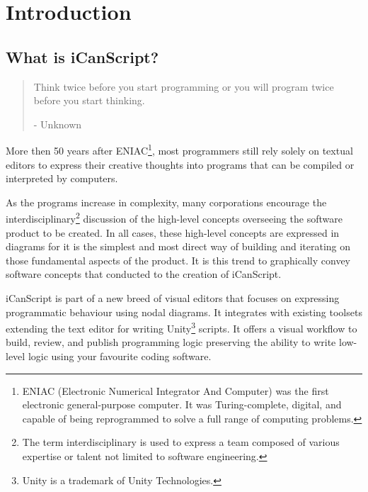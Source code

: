 
\def\mytitle{iCanScript User Guide}
\def\myauthor{Michel Launier}
\def\version{v1.1.2}
\def\email{support@icanscript.com}


\pagebreak 

\part{Introduction}
\label{introduction}

\chapter{What is iCanScript?}
\label{whatisicanscript}

\begin{quote}

\textwidth

Think twice before you start programming or you will program twice before you start thinking. 

\noindent\makebox[0.5\linewidth]{\rule{0.5\linewidth}{0.4pt}}

- Unknown
\end{quote}



More then 50 years after ENIAC\footnote{ENIAC (Electronic Numerical Integrator And Computer) was the first electronic general-purpose computer. It was Turing-complete, digital, and capable of being reprogrammed to solve a full range of computing problems.}, most programmers still rely solely on textual editors to express their creative thoughts into programs that can be compiled or interpreted by computers.

As the programs increase in complexity, many corporations encourage the interdisciplinary\footnote{The term interdisciplinary is used to express a team composed of various expertise or talent not limited to software engineering.} discussion of the high-level concepts overseeing the software product to be created. In all cases, these high-level concepts are expressed in diagrams for it is the simplest and most direct way of building and iterating on those fundamental aspects of the product. It is this trend to graphically convey software concepts that conducted to the creation of iCanScript.

iCanScript is part of a new breed of visual editors that focuses on expressing programmatic behaviour using nodal diagrams. It integrates with existing toolsets extending the text editor for writing Unity\footnote{Unity is a trademark of Unity Technologies.} scripts. It offers a visual workflow to build, review, and publish programming logic preserving the ability to write low-level logic using your favourite coding software.

